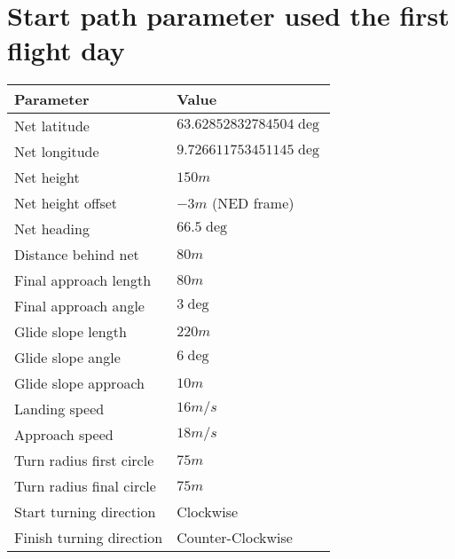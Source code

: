 \section{Start path parameter used the first flight day}
\begin{table}
\centering
\begin{tabular}{| p{4cm} | p{4cm} |}
\hline
\textbf{Parameter}			& \textbf{Value}			\\ \hline
Net latitude				& $63.62852832784504 \deg$ 	\\ \hline
Net longitude				& $9.726611753451145 \deg$ 	\\ \hline
Net height					& $150 m$					\\ \hline
Net height offset			& $-3 m$ (NED frame)		\\ \hline
Net heading					& $66.5 \deg$				\\ \hline
Distance behind net			& $80 m$					\\ \hline
Final approach length		& $80 m$					\\ \hline
Final approach angle		& $3 \deg$					\\ \hline
Glide slope length			& $220 m $					\\ \hline
Glide slope angle			& $6 \deg$					\\ \hline
Glide slope approach		& $10 m$					\\ \hline
Landing speed				& $16 m/s$					\\ \hline
Approach speed				& $18 m/s$					\\ \hline
Turn radius first circle	& $75 m$					\\ \hline
Turn radius final circle	& $75 m$					\\ \hline
Start turning direction		& Clockwise					\\ \hline
Finish turning direction	& Counter-Clockwise			\\ \hline
\end{tabular}
\end{table}
